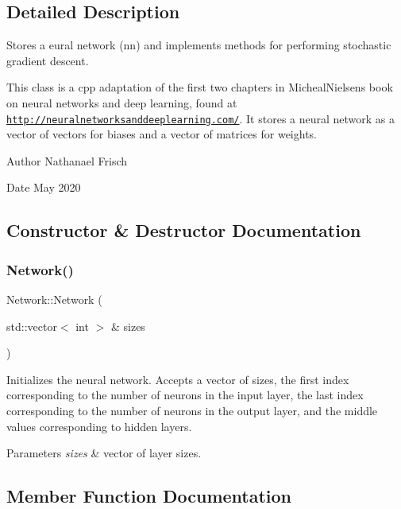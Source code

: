 \subsection{Detailed Description}
Stores a eural network (nn) and implements methods for performing stochastic gradient descent. 

This class is a cpp adaptation of the first two chapters in Micheal\+Nielsen\textquotesingle{}s book on neural networks and deep learning, found at \href{http://neuralnetworksanddeeplearning.com/}{\tt http\+://neuralnetworksanddeeplearning.\+com/}. It stores a neural network as a vector of vectors for biases and a vector of matrices for weights.

\begin{DoxyAuthor}{Author}
Nathanael Frisch 
\end{DoxyAuthor}
\begin{DoxyDate}{Date}
May 2020 
\end{DoxyDate}


\subsection{Constructor \& Destructor Documentation}
\mbox{\label{classNetwork_aa6382995a4a0bc915d12d794eb584adf}} 
\subsubsection{\texorpdfstring{Network()}{Network()}}
{\footnotesize\ttfamily Network\+::\+Network (\begin{DoxyParamCaption}\item[{std\+::vector$<$ int $>$ \&}]{sizes }\end{DoxyParamCaption})}

Initializes the neural network. Accepts a vector of sizes, the first index corresponding to the number of neurons in the input layer, the last index corresponding to the number of neurons in the output layer, and the middle values corresponding to hidden layers.


\begin{DoxyParams}{Parameters}
{\em sizes} & vector of layer sizes. \\
\hline
\end{DoxyParams}


\subsection{Member Function Documentation}
\mbox{\label{classNetwork_a657a8db0aad5e948118f188b19d8584c}} 
